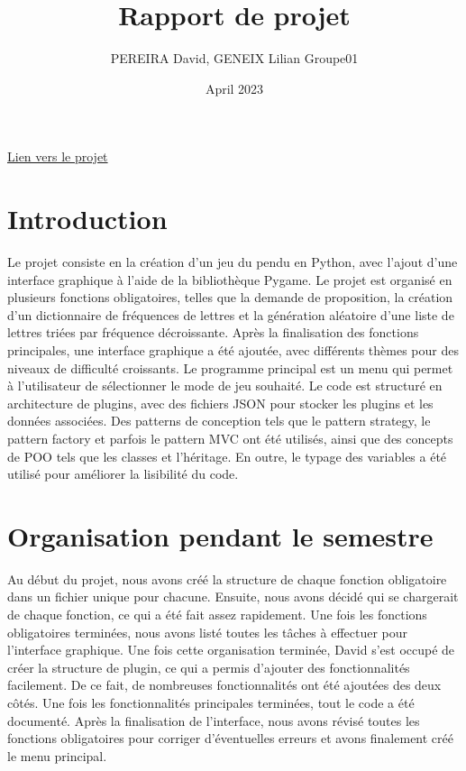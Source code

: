 \documentclass{article}
\title{Rapport de projet}
\author{PEREIRA David, GENEIX Lilian Groupe01}
\date{April 2023}
\begin{document}
\maketitle

\href{https://gitlab.isima.fr/dapereira3/jeu-du-pendu}{Lien vers le projet}


\section{Introduction}

Le projet consiste en la création d'un jeu du pendu en Python, avec l'ajout d'une interface graphique à l'aide de la bibliothèque Pygame. Le projet est organisé en plusieurs fonctions obligatoires, telles que la demande de proposition, la création d'un dictionnaire de fréquences de lettres et la génération aléatoire d'une liste de lettres triées par fréquence décroissante. Après la finalisation des fonctions principales, une interface graphique a été ajoutée, avec différents thèmes pour des niveaux de difficulté croissants. Le programme principal est un menu qui permet à l'utilisateur de sélectionner le mode de jeu souhaité. Le code est structuré en architecture de plugins, avec des fichiers JSON pour stocker les plugins et les données associées. Des patterns de conception tels que le pattern strategy, le pattern factory et parfois le pattern MVC ont été utilisés, ainsi que des concepts de POO tels que les classes et l'héritage. En outre, le typage des variables a été utilisé pour améliorer la lisibilité du code.

\section{Organisation pendant le semestre}

Au début du projet, nous avons créé la structure de chaque fonction obligatoire dans un fichier unique pour chacune. Ensuite, nous avons décidé qui se chargerait de chaque fonction, ce qui a été fait assez rapidement. Une fois les fonctions obligatoires terminées, nous avons listé toutes les tâches à effectuer pour l'interface graphique. Une fois cette organisation terminée, David s'est occupé de créer la structure de plugin, ce qui a permis d'ajouter des fonctionnalités facilement. De ce fait, de nombreuses fonctionnalités ont été ajoutées des deux côtés. Une fois les fonctionnalités principales terminées, tout le code a été documenté. Après la finalisation de l'interface, nous avons révisé toutes les fonctions obligatoires pour corriger d'éventuelles erreurs et avons finalement créé le menu principal.
\end{document}
